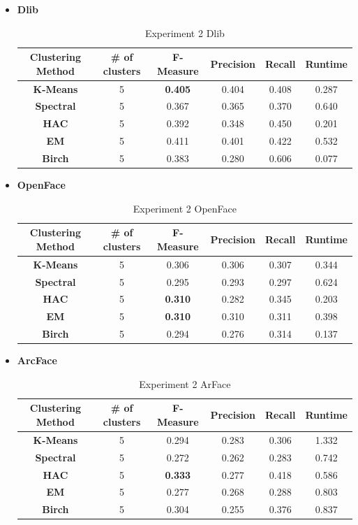 \documentclass[12pt,english]{article}
\begin{document}
\begin{itemize}
\item \textbf{Dlib}
\begin{table}[H]
\centering
\begin{tabular}{||c c c c c c||} 
 \hline
 Clustering Method & \# of clusters & F-Measure & Precision & Recall & Runtime\\ [0.5ex]
 \hline\hline
 \textbf{K-Means} & 5 & \textbf{0.405} & 0.404 & 0.408 & 0.287\\ 
 \hline
  \textbf{Spectral} & 5 & 0.367 & 0.365 & 0.370 & 0.640\\
 \hline
 \textbf{HAC} & 5 & 0.392 & 0.348 & 0.450 & 0.201\\
 \hline
 \textbf{EM} & 5 & 0.411 & 0.401 & 0.422 & 0.532\\
 \hline
 \textbf{Birch} & 5 & 0.383 & 0.280 & 0.606 & 0.077\\
 \hline
\end{tabular}
\caption{Experiment 2 Dlib}
\label{table:ex2dlib}
\end{table}

\item \textbf{OpenFace}
\begin{table}[H]
\centering
\begin{tabular}{||c c c c c c||} 
 \hline
 Clustering Method & \# of clusters & F-Measure & Precision & Recall & Runtime\\ [0.5ex]
 \hline\hline
 \textbf{K-Means} & 5 & 0.306 & 0.306 & 0.307 & 0.344\\ 
 \hline
  \textbf{Spectral} & 5 & 0.295 & 0.293 & 0.297 & 0.624\\
 \hline
 \textbf{HAC} & 5 & \textbf{0.310} & 0.282 & 0.345 & 0.203\\
 \hline
 \textbf{EM} & 5 & \textbf{0.310} & 0.310 & 0.311 & 0.398\\
 \hline
 \textbf{Birch} & 5 & 0.294 & 0.276 & 0.314 & 0.137\\
 \hline
\end{tabular}
\caption{Experiment 2 OpenFace}
\label{table:ex2openface}
\end{table}

\item \textbf{ArcFace}
\begin{table}[H]
\centering
\begin{tabular}{||c c c c c c||} 
 \hline
 Clustering Method & \# of clusters & F-Measure & Precision & Recall & Runtime\\ [0.5ex]
 \hline\hline
 \textbf{K-Means} & 5 & 0.294 & 0.283 & 0.306 & 1.332\\ 
 \hline
  \textbf{Spectral} & 5 & 0.272 & 0.262 & 0.283 & 0.742\\
 \hline
 \textbf{HAC} & 5 & \textbf{0.333} & 0.277 & 0.418 & 0.586\\
 \hline
 \textbf{EM} & 5 & 0.277 & 0.268 & 0.288 & 0.803\\
 \hline
 \textbf{Birch} & 5 & 0.304 & 0.255 & 0.376 & 0.837\\
 \hline
\end{tabular}
\caption{Experiment 2 ArFace}
\label{table:ex2arcface}
\end{table}
\end{itemize}
\end{document}
